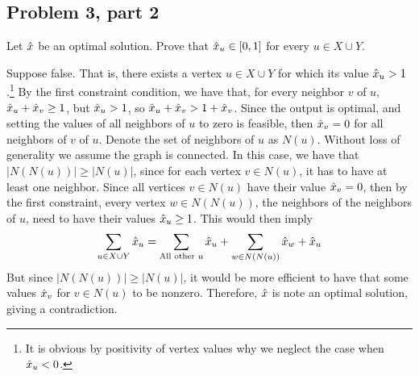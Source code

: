 \subsection{Problem 3, part 2}
Let $\hat{x}$ be an optimal solution. Prove that $\hat{x}_u \in [0, 1]$ for every $u \in X\cup Y$.
\partbreak
\begin{solution}

    Suppose false. That is, there exists a vertex $u \in X \cup Y$ for which its value $\hat{x}_u > 1$.\footnote{It is obvious by positivity of vertex values why we neglect the case when $\hat{x}_u < 0$.} By the first constraint condition, we have that, for every neighbor $v$ of $u$, $\hat{x}_u + \hat{x}_v \geq 1$, but $\hat{x}_u > 1$, so $\hat{x}_u + \hat{x}_v > 1 + \hat{x}_v$. Since the output is optimal, and setting the values of all neighbors of $u$ to zero is feasible, then $\hat{x}_v = 0$ for all neighbors of $v$ of $u$. Denote the set of neighbors of $u$ as $N(u)$. Without loss of generality we assume the graph is connected. In this case, we have that $|N(N(u))| \geq |N(u)|$, since for each vertex $v \in N(u)$, it has to have at least one neighbor. Since all vertices $v \in N(u)$ have their value $\hat{x}_v = 0$, then by the first constraint, every vertex $w \in N(N(u))$, the neighbors of the neighbors of $u$, need to have their values $\hat{x}_u \geq 1$. This would then imply 
    \[\sum_{u \in X \cup Y} \hat{x}_u = \sum_{\text{All other $u$}}\hat{x}_u + \sum_{w \in N(N(u))}\hat{x}_w + \hat{x}_u\]
    But since $|N(N(u))| \geq |N(u)|$, it would be more efficient to have that some values $\hat{x}_v$ for $v \in N(u)$ to be nonzero. Therefore, $\hat{x}$ is note an optimal solution, giving a contradiction. 
\end{solution}
\newpage

